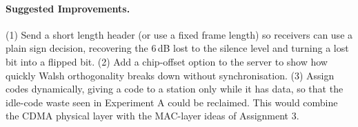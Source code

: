 \documentclass[11pt]{article}
\begin{document}
\paragraph{Suggested Improvements.} (1) Send a short length header (or use a fixed frame
length) so receivers can use a plain sign decision, recovering the 6\,dB lost to the silence
level and turning a lost bit into a flipped bit. (2) Add a chip-offset option to the server
to show how quickly Walsh orthogonality breaks down without synchronisation. (3) Assign codes
dynamically, giving a code to a station only while it has data, so that the idle-code waste
seen in Experiment A could be reclaimed. This would combine the CDMA physical layer with the
MAC-layer ideas of Assignment 3.
\end{document}
